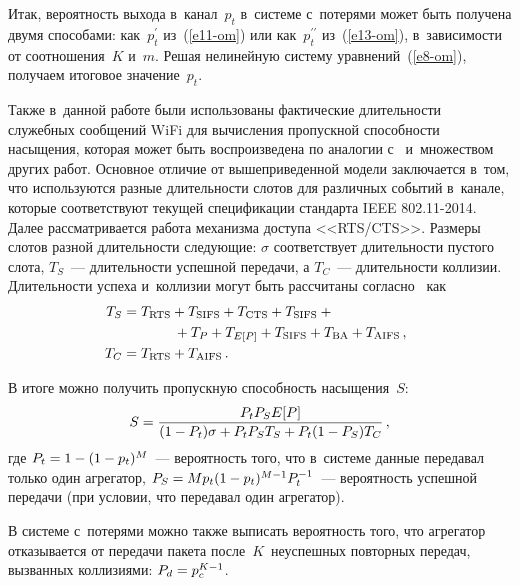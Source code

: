 \begin{multicols}{2}
    Итак, вероятность выхода в~канал~$p_t$ в~системе с~потерями может 
быть получена двумя способами: как~$p^\prime_t$ из~(\ref{e11-om}) или 
как~$p_t^{\prime\prime}$ из~(\ref{e13-om}), в~зависимости от 
соотношения~$K$ и~$m$. Решая нелинейную систему 
уравнений~(\ref{e8-om}), получаем итоговое значение~$p_t$.
    
    Также в~данной работе были использованы фактические 
длительности служебных сообщений\linebreak
 WiFi для вычисления пропускной 
способности насыщения, которая может быть воспроизведена по 
аналогии с~\cite{9-om, 8-om, 11-om} и~множеством других работ. Основное 
отличие от вышеприведенной модели заключается в~том, что 
используются разные длительности слотов для различных событий 
в~канале, которые соответствуют текущей спецификации стандарта IEEE 
802.11-2014. Далее рассматривается работа механизма доступа 
<<RTS/CTS>>. Размеры слотов разной длительности следующие: 
$\sigma$ соответствует длительности пустого слота, $T_S$~--- 
длительности успешной передачи, а $T_C$~--- длительности коллизии. 
Длительности успеха и~коллизии могут быть рассчитаны 
согласно~\cite{7-om} как
    \begin{align*}
       \hspace*{-2mm}T_S &= T_{\mathrm{RTS}}+ T_{\mathrm{SIFS}}+ T_{\mathrm{CTS}}+ T_{\mathrm{SIFS}} +{}       \hspace*{2mm}\\
    &\hspace*{13mm}{}+T_P+ T_{E[P]}  +T_{\mathrm{SIFS}} +T_{\mathrm{BA}}+T_{\mathrm{AIFS}}\,,       \\
          \hspace*{-2mm} T_C &= T_{\mathrm{RTS}} +T_{\mathrm{AIFS}}\,.       \hspace*{2mm}
    \end{align*}
    
    В итоге можно получить пропускную способность насыщения~$S$:
    \begin{equation*}
    S= \displaystyle\frac{\displaystyle P_t P_S E[P]\mathstrut}{\displaystyle (1-P_t)\sigma +P_t P_S T_S +P_t(1-P_S) T_C\mathstrut}\,,
    \end{equation*}
где $P_t= 1-(1\hm- p_t)^M$~--- вероятность того, что в~системе данные 
передавал только один агрегатор, $P_S\hm= Mp_t(1\hm- p_t)^{M-1}P_t^{-
1}$~--- вероятность успешной передачи (при условии, что передавал 
один агрегатор). 

    В системе с~потерями можно также выписать вероятность того, что 
агрегатор отказывается от передачи пакета после~$K$~неуспешных 
повторных передач, вызванных коллизиями: $P_d\hm= p_c^{K-1}$.


\end{multicols}
